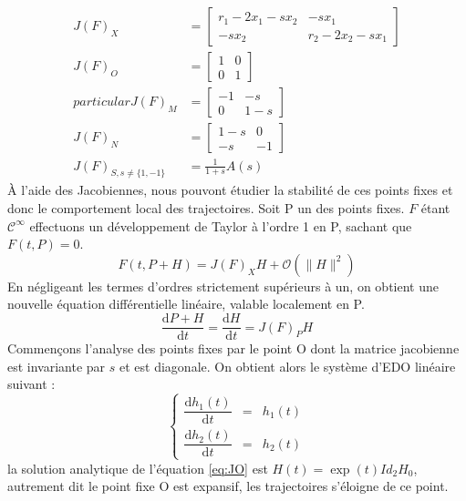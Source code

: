 \documentclass{wsdcr}
\begin{document}
\begin{equation}
\begin{aligned}
J(F)_X &= \begin{bmatrix}r_1-2x_1-sx_2&-sx_1\\-sx_2&r_2-2x_2-sx_1\end{bmatrix} \\
J(F)_{O} &= \begin{bmatrix}1&0\\0&1\end{bmatrix} \\particular
J(F)_{M} &= \begin{bmatrix}-1&-s\\0&1-s\end{bmatrix} \\
J(F)_{N} &= \begin{bmatrix}1-s&0\\-s&-1\end{bmatrix} \\
J(F)_{S,s\neq \{1,-1\}} &= \frac{1}{1+s}A(s)
\end{aligned}
\end{equation}
À l'aide des Jacobiennes, nous pouvont étudier la stabilité de ces points fixes et donc le comportement local des trajectoires. Soit P un des points fixes. $F$ étant $\mathcal{C}^\infty$ effectuons un développement de Taylor à l'ordre 1 en P, sachant que $F(t,P)=0$.
\begin{equation}
F(t,P+H)=J(F)_XH + \mathcal{O}(\|H\|^2) 
\end{equation}
En négligeant les termes d'ordres strictement supérieurs à un, on obtient une nouvelle équation différentielle linéaire, valable localement en P.
\begin{equation}
{\dfrac {\mathrm {d} P+H}{\mathrm {d} t}}={\dfrac {\mathrm {d} H}{\mathrm {d} t}}=J(F)_PH
\end{equation}
Commençons l'analyse des points fixes par le point O dont la matrice jacobienne est invariante par $s$ et est diagonale. On obtient alors le système d'EDO linéaire suivant : 
\begin{equation}
\left\{
{\begin{array}{ccc}{\dfrac {\mathrm {d} h_1(t)}{\mathrm {d} t}}&=&h_1(t)\\{\dfrac {\mathrm {d} h_2(t)}{\mathrm {d} t}}&=&h_2(t)\end{array}}
\right.
\label{eq:JO}
\end{equation}
la solution analytique de l'équation \ref{eq:JO} est $H(t)=\exp(t)Id_2H_0$, autrement dit le point fixe O est expansif, les trajectoires s'éloigne de ce point. \\
\end{document}
